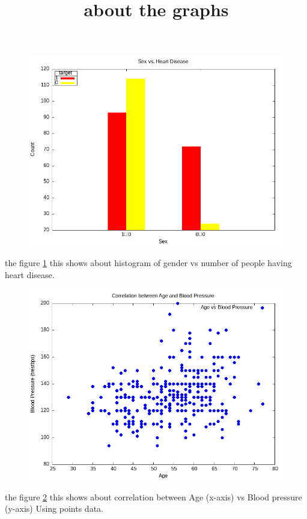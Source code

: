 \documentclass{article}
\title{about the graphs}
\date{}
\begin{document}
	\maketitle
	\begin{figure}[H]
		\includegraphics[width=\textwidth]{4.1.png}
		\label{fig:gender vs number}
	\end{figure}
	the figure \ref{fig:gender vs number} this shows about histogram of gender vs number of people having heart disease. 
	\begin{figure}[H]
		\includegraphics[width=\textwidth]{4.2.png}
		\label{fig: Age  vs Blood pressure}
	\end{figure}
	the figure \ref{fig: Age  vs Blood pressure} this shows about correlation between Age (x-axis) vs Blood pressure (y-axis) Using points data.
\end{document}
